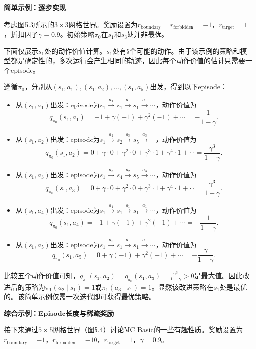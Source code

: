 \documentclass[UTF8]{article}
\begin{document}
\textbf{简单示例：逐步实现}

考虑图5.3所示的$3 \times 3$网格世界。奖励设置为$r_{\text{boundary}} = r_{\text{forbidden}} = -1$，$r_{\text{target}} = 1$，折扣因子$\gamma = 0.9$。初始策略$\pi_0$在$s_1$和$s_3$处并非最优。

下面仅展示$s_1$处的动作价值计算。$s_1$处有5个可能的动作。由于该示例的策略和模型都是确定性的，多次运行会产生相同的轨迹，因此每个动作价值的估计只需要一个episode。

遵循$\pi_0$，分别从$(s_1, a_1), (s_1, a_2), \ldots, (s_1, a_5)$出发，得到以下episode：
\begin{itemize}
    \item 从$(s_1, a_1)$出发：episode为$s_1 \xrightarrow{a_1} s_1 \xrightarrow{a_1} s_1 \xrightarrow{a_1} \cdots$，动作价值为
    \[
    q_{\pi_0}(s_1, a_1) = -1 + \gamma(-1) + \gamma^2(-1) + \cdots = -\frac{1}{1-\gamma}.
    \]
    \item 从$(s_1, a_2)$出发：episode为$s_1 \xrightarrow{a_2} s_2 \xrightarrow{a_3} s_5 \xrightarrow{a_3} \cdots$，动作价值为
    \[
    q_{\pi_0}(s_1, a_2) = 0 + \gamma \cdot 0 + \gamma^2 \cdot 0 + \gamma^3 \cdot 1 + \gamma^4 \cdot 1 + \cdots = \frac{\gamma^3}{1-\gamma}.
    \]
    \item 从$(s_1, a_3)$出发：episode为$s_1 \xrightarrow{a_3} s_4 \xrightarrow{a_2} s_5 \xrightarrow{a_3} \cdots$，动作价值为
    \[
    q_{\pi_0}(s_1, a_3) = 0 + \gamma \cdot 0 + \gamma^2 \cdot 0 + \gamma^3 \cdot 1 + \gamma^4 \cdot 1 + \cdots = \frac{\gamma^3}{1-\gamma}.
    \]
    \item 从$(s_1, a_4)$出发：episode为$s_1 \xrightarrow{a_4} s_1 \xrightarrow{a_1} s_1 \xrightarrow{a_1} \cdots$，动作价值为
    \[
    q_{\pi_0}(s_1, a_4) = -1 + \gamma(-1) + \gamma^2(-1) + \cdots = -\frac{1}{1-\gamma}.
    \]
    \item 从$(s_1, a_5)$出发：episode为$s_1 \xrightarrow{a_5} s_1 \xrightarrow{a_1} s_1 \xrightarrow{a_1} \cdots$，动作价值为
    \[
    q_{\pi_0}(s_1, a_5) = 0 + \gamma(-1) + \gamma^2(-1) + \cdots = -\frac{\gamma}{1-\gamma}.
    \]
\end{itemize}

比较五个动作价值可知，$q_{\pi_0}(s_1, a_2) = q_{\pi_0}(s_1, a_3) = \frac{\gamma^3}{1-\gamma} > 0$是最大值。因此改进后的策略为$\pi_1(a_2 \mid s_1) = 1$或$\pi_1(a_3 \mid s_1) = 1$。显然该改进策略在$s_1$处是最优的。该简单示例仅需一次迭代即可获得最优策略。

\textbf{综合示例：Episode长度与稀疏奖励}

接下来通过$5 \times 5$网格世界（图5.4）讨论MC Basic的一些有趣性质。奖励设置为$r_{\text{boundary}} = -1$，$r_{\text{forbidden}} = -10$，$r_{\text{target}} = 1$，$\gamma = 0.9$。
\end{document}
